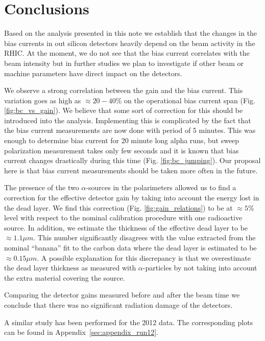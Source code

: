 \documentclass[a4paper,12pt]{article}
\begin{document}
\section{Conclusions}

Based on the analysis presented in this note we establish that the changes in
the bias currents in out silicon detectors heavily depend on the beam activity
in the RHIC. At the moment, we do not see that the bias current correlates with
the beam intensity but in further studies we plan to investigate if other beam
or machine parameters have direct impact on the detectors.

We observe a strong correlation between the gain and the bias current.
This variation goes as high as $\approx 20-40\%$ on the operational bias current
span (Fig. \ref{fig:bc_vs_gain}). We believe that some sort of correction for
this should be introduced into the analysis. Implementing this is complicated by
the fact that the bias current measurements are now done with period of 5 minutes.
This was enough to determine bias current for 20 minute long alpha runs, but
sweep polarization measurement takes only few seconds and it is known that
bias current changes drastically during this time (Fig. \ref{fig:bc_jumping}).
Our proposal here is that bias current measurements should be taken
more often in the future.

The presence of the two $\alpha$-sources in the polarimeters allowed us to find
a correction for the effective detector gain by taking into account the energy
lost in the dead layer. We find this correction (Fig. \ref{fig:gain_relations}) to be at $\approx 5\%$ level
with respect to the nominal calibration procedure with one radioactive source.
In addition, we estimate the thickness of the effective dead layer to be
$\approx 1.1\mu m$. This number significantly disagrees with the value extracted
from the nominal ``banana'' fit to the carbon data where the dead layer is
estimated to be $\approx 0.15\mu m$. A possible explanation for this discrepancy
is that we overestimate the dead layer thickness as measured with
$\alpha$-particles by not taking into account the extra material covering the
source.

Comparing the detector gains measured before and after the beam time we conclude
that there was no significant radiation damage of the detectors.

A similar study has been performed for the 2012 data. The corresponding plots
can be found in Appendix~\ref{sec:appendix_run12}.
\end{document}
